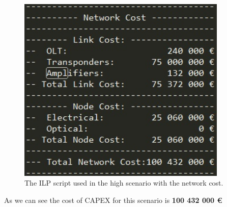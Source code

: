 \begin{figure}[h!]
\centering
\includegraphics[width=10cm]{sdf/ilp/opaque_survivability/figures/script_opaque_surv_ref_high}
\caption{The ILP script used in the high scenario with the network cost.}
\label{scriptopaque_surv_ref_high}
\end{figure}

As we can see the cost of CAPEX for this scenario is \textbf{100 432 000 \euro}\\
